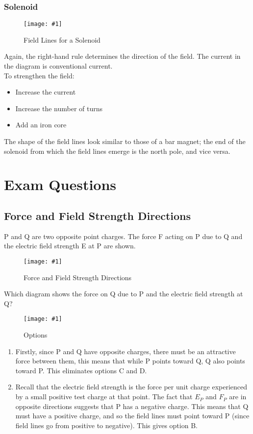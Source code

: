 \documentclass[a4paper,12pt]{article}
\let\oldsection\section
\renewcommand\section{\clearpage\oldsection}
\newcommand{\lb}{\\[8pt]}
\newcommand{\img}[4]{\begin{center}
  \begin{figure}[H]
    \centering
    \texttt{[image: \#1]}
    \caption{#3}
    \label{fig:#4}
  \end{figure}
\end{center}}
\begin{document}
\pagebreak

\subsubsection{Solenoid}

\img{solenoid.jpg}{0.9}{Field Lines for a Solenoid}{solenoid}

Again, the right-hand rule determines the direction of the field. The current in the diagram is conventional current.\lb
To strengthen the field:
\begin{itemize}
  \item Increase the current
  \item Increase the number of turns
  \item Add an iron core
\end{itemize}
The shape of the field lines look similar to those of a bar magnet; the end of the solenoid from which the field lines emerge is the north pole, and vice versa.

\section{Exam Questions}

\subsection{Force and Field Strength Directions}

P and Q are two opposite point charges. The force F acting on P due to Q and the electric field strength E at P are shown.
\img{ex/estrengthdirection.png}{0.5}{Force and Field Strength Directions}{estrengthdirection}
Which diagram shows the force on Q due to P and the electric field strength at Q?
\img{ex/estrengthdirection_options.png}{0.8}{Options}{estrengthdirection}

\begin{enumerate}
  \item Firstly, since P and Q have opposite charges, there must be an attractive force between them, this means that while P points toward Q, Q also points toward P. This eliminates options C and D.
  \item Recall that the electric field strength is the force per unit charge experienced by a small positive test charge at that point. The fact that $E_P$ and $F_P$ are in opposite directions suggests that P has a negative charge. This means that Q must have a positive charge, and so the field lines must point toward P (since field lines go from positive to negative). This gives option B.
\end{enumerate}
\end{document}
